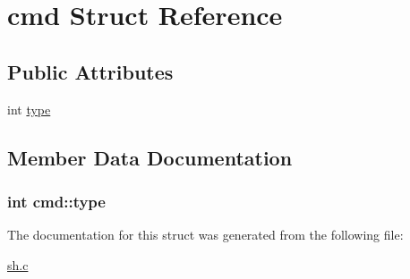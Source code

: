 \hypertarget{structcmd}{}\section{cmd Struct Reference}
\label{structcmd}
\subsection*{Public Attributes}
\begin{DoxyCompactItemize}
\item 
int \hyperlink{structcmd_a9b861866e1dec63e694247fb4d976423}{type}
\end{DoxyCompactItemize}


\subsection{Member Data Documentation}
\subsubsection[{\texorpdfstring{type}{type}}]{\setlength{\rightskip}{0pt plus 5cm}int cmd\+::type}\hypertarget{structcmd_a9b861866e1dec63e694247fb4d976423}{}\label{structcmd_a9b861866e1dec63e694247fb4d976423}


The documentation for this struct was generated from the following file\+:\begin{DoxyCompactItemize}
\item 
\hyperlink{sh_8c}{sh.\+c}\end{DoxyCompactItemize}
